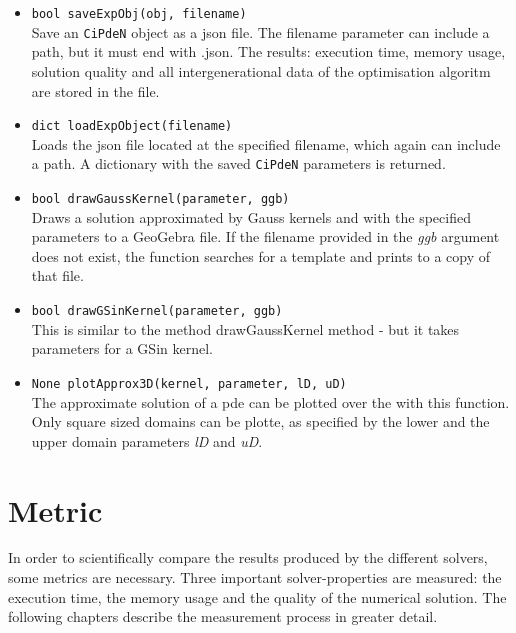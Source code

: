 \documentclass[./\jobname.tex]{subfiles}
\begin{document}
\begin{itemize}
	\item \colorbox{light-gray}{\lstinline[basicstyle=\ttfamily\color{black}]|bool saveExpObj(obj, filename)|} \\
	Save an \colorbox{light-gray}{\lstinline[basicstyle=\ttfamily\color{black}]|CiPdeN|} object as a \gls{json} file. The filename parameter can include a path, but it must end with .json. The results: execution time, memory usage, solution quality and all intergenerational data of the optimisation algoritm are stored in the file. 
	\item \colorbox{light-gray}{\lstinline[basicstyle=\ttfamily\color{black}]|dict loadExpObject(filename)|} \\
	Loads the \gls{json} file located at the specified filename, which again can include a path. A dictionary with the saved \colorbox{light-gray}{\lstinline[basicstyle=\ttfamily\color{black}]|CiPdeN|} parameters is returned. 
	\item \colorbox{light-gray}{\lstinline[basicstyle=\ttfamily\color{black}]|bool drawGaussKernel(parameter, ggb)|} \\
	Draws a solution approximated by Gauss kernels and with the specified parameters to a GeoGebra file. If the filename provided in the \textit{ggb} argument does not exist, the function searches for a template and prints to a copy of that file. 
	\item \colorbox{light-gray}{\lstinline[basicstyle=\ttfamily\color{black}]|bool drawGSinKernel(parameter, ggb)|} \\
	This is similar to the method drawGaussKernel method - but it takes parameters for a GSin kernel. 
	\item 
	\colorbox{light-gray}{\lstinline[basicstyle=\ttfamily\color{black}]|None plotApprox3D(kernel, parameter, lD, uD)|} \\
	The approximate solution of a \gls{pde} can be plotted over the with this function. Only square sized domains can be plotte, as specified by the lower and the upper domain parameters \textit{lD} and \textit{uD}. 
\end{itemize}

\section{Metric} 
\label{chap:metric}
In order to scientifically compare the results produced by the different solvers, some metrics are necessary. Three important solver-properties are measured: the execution time, the memory usage and the quality of the numerical solution. The following chapters describe the measurement process in greater detail. 
\end{document}

